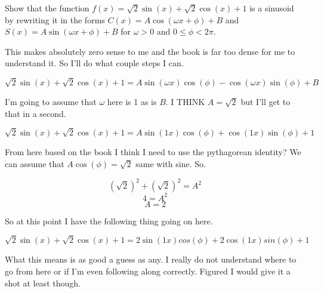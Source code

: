 \documentclass[10pt,letterpaper]{amspset}
\begin{document}
\pagebreak


\begin{problem}[25]
    Show that the function $f(x) = \sqrt{2}\sin(x) + \sqrt{2}\cos(x) + 1$ is a sinusoid by rewriting it in the forms $C(x) = A\cos(\omega x + \phi) + B$ and $S(x) = A\sin(\omega x + \phi) + B$ for $\omega > 0$ and $0 \leq \phi < 2\pi$.
\end{problem}

\begin{solution}[Solution]
    This makes absolutely zero sense to me and the book is far too dense for me to understand it. So I'll do what couple steps I can.
    
    \[ \sqrt{2}\sin(x) + \sqrt{2}\cos(x) + 1 =  A\sin(\omega x) \cos(\phi) - \cos(\omega x) \sin(\phi) + B\]
    
    I'm going to assume that $\omega$ here is 1 as is $B$. I THINK $A = \sqrt{2}$ but I'll get to that in a second.
    
    \[ \sqrt{2}\sin(x) + \sqrt{2}\cos(x) + 1 =  A\sin(1 x) \cos(\phi) + \cos(1 x) \sin(\phi) + 1\]
    
    From here based on the book I think I need to use the pythagorean identity? We can assume that $A\cos(\phi) = \sqrt{2}$ same with sine. So. 
    
    \[(\sqrt{2})^2 + (\sqrt{2})^2 = A^2\]
    \[ 4 = A^2\]
    \[ A = 2\]
    
    So at this point I have the following thing going on here.
    
    \[ \sqrt{2}\sin(x) + \sqrt{2}\cos(x) + 1 =  2\sin(1 x) cos(\phi) + 2 \cos(1 x) sin(\phi) + 1 \]
    
    What this means is as good a guess as any. I really do not understand where to go from here or if I'm even following along correctly. Figured I would give it a shot at least though.
\end{solution}
\end{document}
